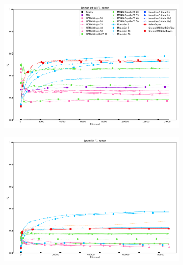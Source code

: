 \begin{figure}
	\begin{subfigure}[t]{.49\linewidth}
		\includegraphics[width=\linewidth]{figures/results/banos_3_f1.png}
		\caption{\banosdataset}
		\label{fig:f1-banos}
	\end{subfigure}
	\hfill
	\begin{subfigure}[t]{.49\linewidth}
		\includegraphics[width=\linewidth]{figures/results/recofit_3_f1.png}
		\caption{\recofitdataset}
		\label{fig:f1-recofit}
	\end{subfigure}\\
	\begin{subfigure}[t]{.49\linewidth}

\end{subfigure}
\end{figure}
